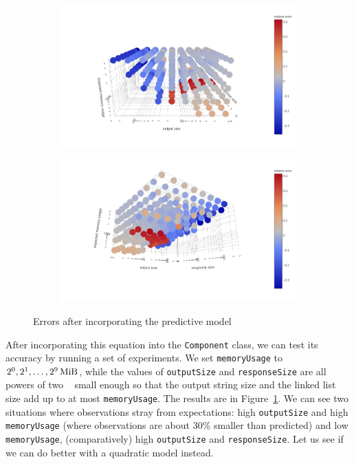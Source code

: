 \documentclass{article}
\begin{document}
\begin{figure}
  \centering
   \begin{subfigure}[t]{0.49\textwidth}
    \centering
    \includegraphics[width=\textwidth]{../io_local_tests/experiment3errors1.png}
  \end{subfigure}
  \begin{subfigure}[t]{0.49\textwidth}
    \centering
    \includegraphics[width=\textwidth]{../io_local_tests/experiment3errors2.png}
  \end{subfigure}
  \caption{Errors after incorporating the predictive model}
  \label{fig:empirical_errors}
\end{figure}

After incorporating this equation into the \texttt{Component} class, we can test
its accuracy by running a set of experiments. We set \texttt{memoryUsage} to
$2^0, 2^1, \dots, \SI[exponent-base = 2]{e9}{\mebi\byte}$, while the values of
\texttt{outputSize} and \texttt{responseSize} are all powers of two
\si{\mebi\byte} small enough so that the output string size and the linked list
size add up to at most \texttt{memoryUsage}. The results are in
Figure~\ref{fig:empirical_errors}. We can see two situations where observations
stray from expectations: high \texttt{outputSize} and high \texttt{memoryUsage}
(where observations are about 30\% smaller than predicted) and low
\texttt{memoryUsage}, (comparatively) high \texttt{outputSize} and
\texttt{responseSize}. Let us see if we can do better with a quadratic model
instead.
\end{document}

